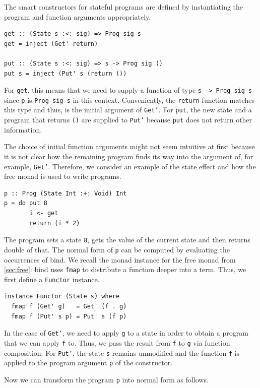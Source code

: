 \documentclass[a4paper, 11pt, fleqn, twoside, abstract=on]{scrreprt}
\newcommand{\hinl}[1]{\texttt{#1}}
\begin{document}
The smart constructors for stateful programs are defined by instantiating the program and function arguments appropriately.

\begin{verbatim}
get :: (State s :<: sig) => Prog sig s
get = inject (Get' return)

put :: (State s :<: sig) => s -> Prog sig ()
put s = inject (Put' s (return ())
\end{verbatim}
\noindent
For \hinl{get}, this means that we need to supply a function of type \hinl{s -> Prog sig s} since \hinl{p} is \hinl{Prog sig s} in this context.
Conveniently, the \hinl{return} function matches this type and thus, is the initial argument of \hinl{Get'}.
For \hinl{put}, the new state and a program that returns \hinl{()} are supplied to \hinl{Put'} because \hinl{put} does not return other information.

The choice of initial function arguments might not seem intuitive at first because it is not clear how the remaining program finds its way into the argument of, for example, \hinl{Get'}.
Therefore, we consider an example of the state effect and how the free monad is used to write programs.

\begin{verbatim}
p :: Prog (State Int :+: Void) Int
p = do put 8
       i <- get
       return (i * 2)
\end{verbatim}
\noindent
The program sets a state \hinl{8}, gets the value of the current state and then returns double of that.
The normal form of \hinl{p} can be computed by evaluating the occurrences of bind.
We recall the monad instance for the free monad from \autoref{sec:free}: bind uses \hinl{fmap} to distribute a function deeper into a term.
Thus, we first define a \hinl{Functor} instance.

\begin{verbatim}
instance Functor (State s) where
  fmap f (Get' g)   = Get' (f . g)
  fmap f (Put' s p) = Put' s (f p)
\end{verbatim}
\noindent
In the case of \hinl{Get'}, we need to apply \hinl{g} to a state in order to obtain a program that we can apply \hinl{f} to.
Thus, we pass the result from \hinl{f} to \hinl{g} via function composition.
For \hinl{Put'}, the state \hinl{s} remains unmodified and the function \hinl{f} is applied to the program argument \hinl{p} of the constructor.

Now we can transform the program \hinl{p} into normal form as follows.
\end{document}
